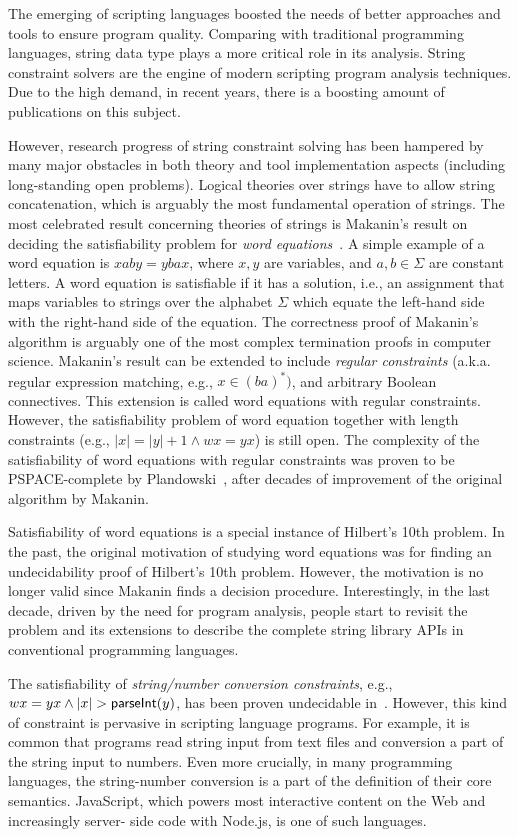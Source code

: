 
The emerging of scripting languages boosted the needs of better approaches and tools to ensure program quality.
Comparing with traditional programming languages, string data type plays a more critical role in its analysis.
String constraint solvers are the engine of modern scripting program analysis techniques. 
Due to the high demand, in recent years, there is a boosting amount of publications on this subject.

However, research progress of string constraint solving has been hampered by many major obstacles in both theory and tool implementation aspects (including long-standing open problems). 
Logical theories over strings have to allow string concatenation, which is arguably the most fundamental operation of strings. 
The most celebrated result concerning theories of strings is Makanin’s result on deciding the satisfiability problem for \emph{word equations}~\cite{makanin77}.
A simple example of a word equation is $xaby = ybax$, where $x, y$ are variables, and $a, b \in \Sigma$ are constant letters. 
A word equation is satisfiable if it has a solution, i.e., an assignment that maps variables to strings over the alphabet $\Sigma$ which equate the left-hand side with the right-hand side of the equation.
The correctness proof of Makanin’s algorithm is arguably one of the most complex termination proofs in computer science. 
Makanin’s result can be extended to include \emph{regular constraints} (a.k.a. regular expression matching, e.g., $x \in (ba)^*)$, and arbitrary Boolean connectives.
This extension is called word equations with regular constraints. 
However, the satisfiability problem of word equation together with length constraints (e.g., $|x|=|y|+1 \wedge wx=yx$) is still open.
The complexity of the satisfiability of word equations with regular constraints was proven to be PSPACE-complete by Plandowski~\cite{plandowski99}, after decades of improvement of the original algorithm by Makanin.

Satisfiability of word equations is a special instance of Hilbert’s 10th problem. 
In the past, the original motivation of studying word equations was for finding an undecidability proof of Hilbert’s 10th problem. 
However, the motivation is no longer valid since Makanin finds a decision procedure. Interestingly, in the last decade, driven by the need for program analysis, people start to revisit the problem and its extensions to describe the complete string library APIs in conventional programming languages.

The satisfiability of \emph{string/number conversion constraints}, e.g., $wx=yx \wedge |x| > \textsf{parseInt}(y)$, has been proven undecidable in~\cite{DayGHMN18}. 
However, this kind of constraint is pervasive in scripting language programs. 
For example, it is common that programs read string input from text files and conversion a part of the string input to numbers.
Even more crucially, in many programming languages, the string-number conversion is a part of the definition of their core semantics. 
JavaScript, which powers most interactive content on the Web and increasingly server- side code with Node.js, is one of such languages. 

